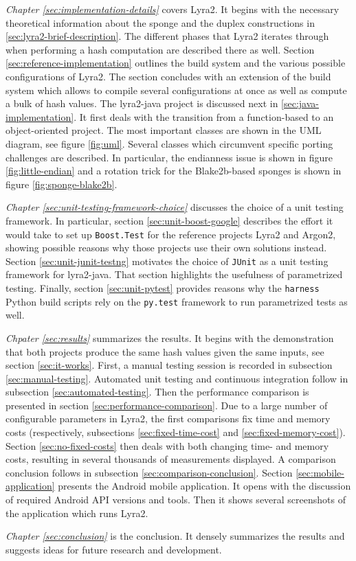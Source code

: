 \emph{Chapter \ref{sec:implementation-details}} covers Lyra2. It begins with the necessary theoretical information about the sponge and the duplex constructions in \ref{sec:lyra2-brief-description}. The different phases that Lyra2 iterates through when performing a hash computation are described there as well. Section \ref{sec:reference-implementation} outlines the build system and the various possible configurations of Lyra2. The section concludes with an extension of the build system which allows to compile several configurations at once as well as compute a bulk of hash values. The lyra2-java project is discussed next in \ref{sec:java-implementation}. It first deals with the transition from a function-based to an object-oriented project. The most important classes are shown in the UML diagram, see figure \ref{fig:uml}. Several classes which circumvent specific porting challenges are described. In particular, the endianness issue is shown in figure \ref{fig:little-endian} and a rotation trick for the Blake2b-based sponges is shown in figure \ref{fig:sponge-blake2b}.

\emph{Chapter \ref{sec:unit-testing-framework-choice}} discusses the choice of a unit testing framework. In particular, section \ref{sec:unit-boost-google} describes the effort it would take to set up \texttt{Boost.Test} for the reference projects Lyra2 and Argon2, showing possible reasons why those projects use their own solutions instead. Section \ref{sec:unit-junit-testng} motivates the choice of \texttt{JUnit} as a unit testing framework for lyra2-java. That section highlights the usefulness of parametrized testing. Finally, section \ref{sec:unit-pytest} provides reasons why the \texttt{harness} Python build scripts rely on the \texttt{py.test} framework to run parametrized tests as well.

\emph{Chpater \ref{sec:results}} summarizes the results. It begins with the demonstration that both projects produce the same hash values given the same inputs, see section \ref{sec:it-works}. First, a manual testing session is recorded in subsection \ref{sec:manual-testing}. Automated unit testing and continuous integration follow in subsection \ref{sec:automated-testing}. Then the performance comparison is presented in section \ref{sec:performance-comparison}. Due to a large number of configurable parameters in Lyra2, the first comparisons fix time and memory costs (respectively, subsections \ref{sec:fixed-time-cost} and \ref{sec:fixed-memory-cost}). Section \ref{sec:no-fixed-costs} then deals with both changing time- and memory costs, resulting in several thousands of measurements displayed. A comparison conclusion follows in subsection \ref{sec:comparison-conclusion}. Section \ref{sec:mobile-application} presents the Android mobile application. It opens with the discussion of required Android API versions and tools. Then it shows several screenshots of the application which runs Lyra2.

\emph{Chapter \ref{sec:conclusion}} is the conclusion. It densely summarizes the results and suggests ideas for future research and development.

